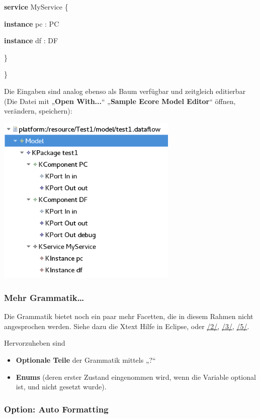 \documentclass[]{article}
\providecommand{\tightlist}{%
  \setlength{\itemsep}{0pt}\setlength{\parskip}{0pt}}
\begin{document}
\textbf{service} MyService \{

\textbf{instance} pc : PC

\textbf{instance} df : DF

\}

\}

Die Eingaben sind analog ebenso als Baum verfügbar und zeitgleich
editierbar (Die Datei mit „\textbf{Open With...}`` „\textbf{Sample Ecore
Model Editor}`` öffnen, verändern, speichern):

\includegraphics[width=3.39090in,height=3.21610in]{./Pictures/10000201000001BD000001A641C76BF87A14C60B.png}

\subsubsection{Mehr Grammatik\ldots{}}\label{mehr-grammatik}

Die Grammatik bietet noch ein paar mehr Facetten, die in diesem Rahmen
nicht angesprochen werden. Siehe dazu die Xtext Hilfe in Eclipse, oder
\protect\hyperlink{anchor-2}{/2/}, \protect\hyperlink{anchor-3}{/3/},
\protect\hyperlink{anchor-5}{/5/}.

Hervorzuheben sind

\begin{itemize}
\tightlist
\item
  \textbf{Optionale Teile }der Grammatik mittels „?``
\item
  \textbf{Enums }(deren erster Zustand eingenommen wird, wenn die
  Variable optional ist, und nicht gesetzt wurde).
\end{itemize}

\subsubsection[Option: Auto
Formatting]{\texorpdfstring{\protect\hypertarget{anchor-27}{}{}Option:
Auto Formatting}{Option: Auto Formatting}}\label{option-auto-formatting}
\end{document}
